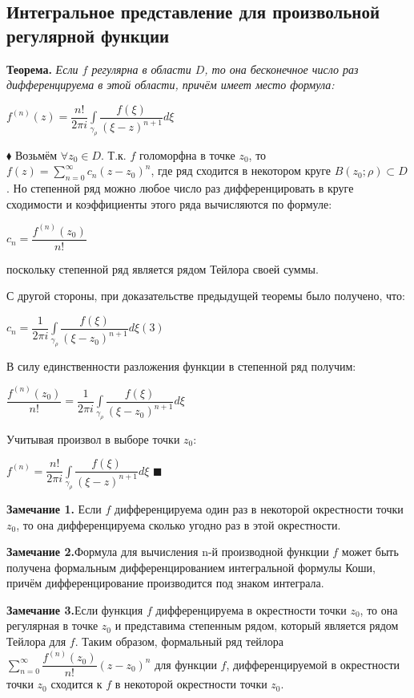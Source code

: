 \documentclass[a4paper, 12pt]{report}
\begin{document}
\par\bigskip
\subsection{Интегральное представление для произвольной регулярной функции}

\textbf{Теорема.} \quad
\textit{Если $f$ регулярна в области $D$, то она бесконечное число раз дифференцируема в этой области, причём имеет место формула:}
\begin{center}
    $f^{(n)}(z) = \dfrac{n!}{2\pi i}\int\limits_{\gamma_{\rho}}\dfrac{f(\xi)}{(\xi - z)^{n+1}}d\xi$
\end{center}

$\blacklozenge$ Возьмём $\forall z_0 \in D$. Т.к. $f$ голоморфна в точке $z_0$, то $f(z) = \sum\limits_{n=0}^{\infty}c_n(z - z_0)^n$, где ряд сходится в некотором круге $B(z_0; \rho) \subset D$. Но степенной ряд можно любое число раз дифференцировать в круге сходимости и коэффициенты этого ряда вычисляются по формуле:
\begin{center}
    $c_n = \dfrac{f^{(n)}(z_0)}{n!}$
\end{center}
поскольку степенной ряд является рядом Тейлора своей суммы.
\par\bigskip
С другой стороны, при доказательстве предыдущей теоремы было получено, что:

\begin{center}
    $c_n = \dfrac{1}{2\pi i}\int\limits_{\gamma_{\rho}}\dfrac{f(\xi)}{(\xi - z_0)^{n+1}}d\xi (3)$
\end{center}

В силу единственности разложения функции в степенной ряд получим:

\begin{center}
   $\dfrac{f^{(n)}(z_0)}{n!} = \dfrac{1}{2\pi i}\int\limits_{\gamma_{\rho}}\dfrac{f(\xi)}{(\xi - z_0)^{n+1}}d\xi$
\end{center}

Учитывая произвол в выборе точки $z_0$:

\begin{center}
   $f^{(n)} = \dfrac{n!}{2\pi i}\int\limits_{\gamma_{\rho}}\dfrac{f(\xi)}{(\xi - z)^{n+1}}d\xi$ \quad$\blacksquare$
\end{center}
\par\bigskip
\textbf{Замечание 1.} \quad Если $f$ дифференцируема один раз в некоторой окрестности точки $z_0$, то она дифференцируема сколько угодно раз в этой окрестности.
\par\bigskip
\textbf{Замечание 2.}\quad Формула для вычисления n-й производной функции $f$ может быть получена формальным дифференцированием интегральной формулы Коши, причём дифференцирование производится под знаком интеграла.
\par\bigskip
\textbf{Замечание 3.}\quad Если функция $f$ дифференцируема в окрестности точки $z_0$, то она регулярная в точке $z_0$ и представима степенным рядом, который является рядом Тейлора для $f$. Таким образом, формальный ряд тейлора $\sum\limits_{n=0}^{\infty}\dfrac{f^{(n)}(z_0)}{n!}(z - z_0)^n$ для функции $f$, дифференцируемой в окрестности точки $z_0$ сходится к $f$ в некоторой окрестности точки $z_0$.
\end{document}

